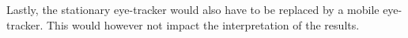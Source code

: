 \documentclass[lettersize, noapacite, twoside, HRI]{apa_HRI}
\begin{document}
Lastly, the stationary eye-tracker would also have to be replaced by a mobile
eye-tracker. This would however not impact the interpretation of the results.

%
%
%
%
%



%
%
\end{document}
